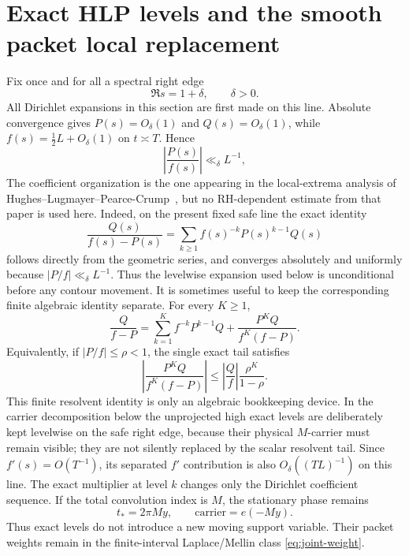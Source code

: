 \section{Exact HLP levels and the smooth packet local replacement}
\label{sec:hlp-local}

Fix once and for all a spectral right edge
\[
\Re s=1+\delta,\qquad \delta>0.
\]
All Dirichlet expansions in this section are first made on this line. Absolute
convergence gives $P(s)=O_\delta(1)$ and $Q(s)=O_\delta(1)$, while
$f(s)=\frac12L+O_\delta(1)$ on $t\asymp T$. Hence
\[
\left|\frac{P(s)}{f(s)}\right|\ll_\delta L^{-1},
\]
The coefficient organization is the one appearing in the local-extrema analysis
of Hughes--Lugmayer--Pearce-Crump~\cite{HLP}, but no RH-dependent estimate from
that paper is used here.  Indeed, on the present fixed safe line the exact
identity
\begin{equation}
\boxed{
\frac{Q(s)}{f(s)-P(s)}
=\sum_{k\ge1}f(s)^{-k}P(s)^{k-1}Q(s)
}
\label{eq:safe-line-HLP-expansion}
\end{equation}
follows directly from the geometric series, and converges absolutely and
uniformly because $|P/f|\ll_\delta L^{-1}$.  Thus the levelwise expansion used
below is unconditional before any contour movement.  It is sometimes useful to
keep the corresponding finite algebraic identity separate.  For every
$K\ge1$,
\begin{equation}
\boxed{
\frac{Q}{f-P}
=\sum_{k=1}^{K}f^{-k}P^{k-1}Q
+\frac{P^KQ}{f^K(f-P)}.
}
\label{eq:finite-HLP-resolvent}
\end{equation}
Equivalently, if $|P/f|\le\rho<1$, the single exact tail satisfies
\[
\left|\frac{P^KQ}{f^K(f-P)}\right|
\le \left|\frac Qf\right|\frac{\rho^K}{1-\rho}.
\]
This finite resolvent identity is only an algebraic bookkeeping device.  In the
carrier decomposition below the unprojected high exact levels are deliberately
kept levelwise on the safe right edge, because their physical $M$-carrier must
remain visible; they are not silently replaced by the scalar resolvent tail.
Since $f'(s)=O(T^{-1})$, its separated $f'$ contribution is also
$O_\delta((T L)^{-1})$ on this line.
The exact multiplier at level $k$ changes only the Dirichlet coefficient
sequence. If the total convolution index is $M$, the stationary phase remains
\begin{equation}
t_*=2\pi My,
\qquad
\text{carrier}=e(-My).
\label{eq:total-carrier}
\end{equation}
Thus exact levels do not introduce a new moving support variable. Their packet
weights remain in the finite-interval Laplace/Mellin class
\eqref{eq:joint-weight}.

